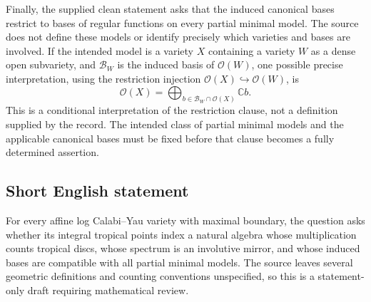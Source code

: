 \documentclass[11pt]{article}
\newcommand{\C}{\mathbb{C}}
\begin{document}
Finally, the supplied clean statement asks that the induced canonical bases restrict to bases of regular functions on every partial minimal model. The source does not define these models or identify precisely which varieties and bases are involved. If the intended model is a variety \(X\) containing a variety \(W\) as a dense open subvariety, and \(\mathcal B_W\) is the induced basis of \(\mathcal O(W)\), one possible precise interpretation, using the restriction injection \(\mathcal O(X)\hookrightarrow\mathcal O(W)\), is
\[
\mathcal O(X)=\bigoplus_{b\in\mathcal B_W\cap\mathcal O(X)}\C b.
\]
This is a conditional interpretation of the restriction clause, not a definition supplied by the record. The intended class of partial minimal models and the applicable canonical bases must be fixed before that clause becomes a fully determined assertion.
\subsection{Short English statement}
For every affine log Calabi--Yau variety with maximal boundary, the question asks whether its integral tropical points index a natural algebra whose multiplication counts tropical discs, whose spectrum is an involutive mirror, and whose induced bases are compatible with all partial minimal models. The source leaves several geometric definitions and counting conventions unspecified, so this is a statement-only draft requiring mathematical review.
\end{document}
